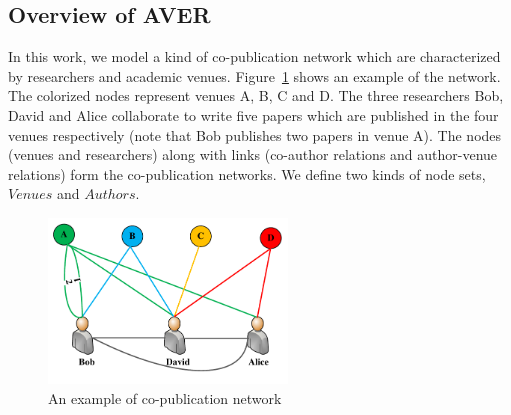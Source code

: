 \documentclass[9pt]{acm_proc_article-sp}
\begin{document}
\subsection{Overview of AVER}
In this work, we model a kind of co-publication network which are characterized by researchers and academic venues. Figure~\ref{Fig2} shows an example of the network. The colorized nodes represent venues A, B, C and D. The three researchers Bob, David and Alice collaborate to write five papers which are published in the four venues respectively (note that Bob publishes two papers in venue A). The nodes (venues and researchers) along with links (co-author relations and author-venue relations) form the co-publication networks. We define two kinds of node sets, $Venues$ and $Authors$.
\begin{figure}[t]
\centering
\includegraphics [width=2.5in]{Fig2.pdf}
\caption{An example of co-publication network}
\label{Fig2}
\end{figure}
\end{document}
